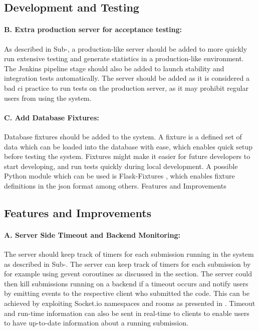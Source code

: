\subsection*{Development and Testing}
\paragraph*{B. Extra production server for acceptance testing:} As described in Sub-, a production-like server should be added to more quickly run extensive testing and generate statistics in a production-like environment. The Jenkins pipeline stage should also be added to launch stability and integration tests automatically. The server should be added as it is considered a bad \gls{ci} practice to run tests on the production server, as it may prohibit regular users from using the system.


\paragraph*{C. Add Database Fixtures:} Database fixtures should be added to the system. A fixture is a defined set of data which can be loaded into the database with ease, which enables quick setup before testing the system. Fixtures might make it easier for future developers to start developing, and run tests quickly during local development. A possible Python module which can be used is Flask-Fixtures \cite{FLASK-FIXTURES}, which enables fixture definitions in the \gls{json} format among others. Features and Improvements

\subsection*{Features and Improvements}
\paragraph*{A. Server Side Timeout and Backend Monitoring:} The server should keep track of timers for each submission running in the system as described in Sub-. The server can keep track of timers for each submission by for example using gevent coroutines \cite{GEVENT} as discussed in the section. The server could then kill submissions running on a backend if a timeout occurs and notify users by emitting events to the respective client who submitted the code. This can be achieved by exploiting Socket.io namespaces and rooms as presented in . Timeout and run-time information can also be sent in real-time to clients to enable users to have up-to-date information about a running submission.


